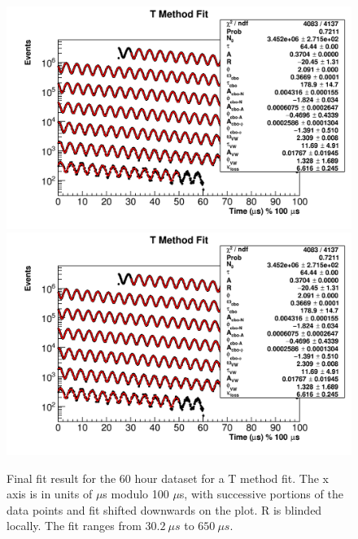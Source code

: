 	\begin{figure}[]
		\centering
		\includegraphics[width=\textwidth]{Figures/TMethod/Main/TMethod_moduloPlot}
		\includegraphics[width=\textwidth]{TMethod_moduloPlot.png}
	    \caption[TMethod_moduloPlot]{Final fit result for the 60 hour dataset for a T method fit. The x axis is in units of $\mu$s modulo 100 $\mu$s, with successive portions of the data points and fit shifted downwards on the plot. R is blinded locally. The fit ranges from $\SI{30.2}{\mu s}$ to $\SI{650}{\mu s}$.}
	    \label{fig:TMethod_moduloPlot}
	\end{figure}

